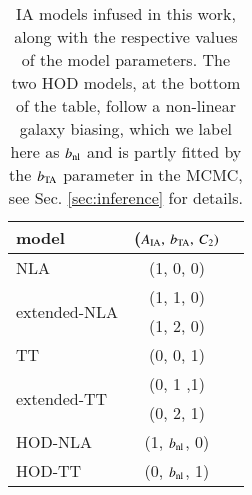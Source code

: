 \begin{table}
   \centering
    \caption{IA models infused in this work, along with the respective values of the model parameters. The two HOD models, at the bottom of the table, follow a non-linear galaxy biasing, which we label here as $b_{\rm nl}$ and is partly fitted by the $b_{\rm TA}$ parameter in the MCMC, see Sec. \ref{sec:inference} for details. }
   \begin{tabular}{@{} lcr @{}} %
      \hline
      \hline
      model   		& ($A_{\rm IA}, \: b_{\rm TA}, \: C_2)$ \\
      \hline
      NLA     		& {(1, 0, 0) }&  \\
      \multirow{2}{*}{extended-NLA }  	&   {(1, 1, 0)}   \\
      							&  {(1, 2, 0)}   \\
      TT 			&  {(0, 0, 1)} &  \\
      \multirow{2}{*}{extended-TT} 	&  {(0, 1 ,1)}   \\
      				&  {(0, 2, 1)}   \\
				HOD-NLA & {(1, $b_{\rm nl}$, 0)} \\
				HOD-TT & {(0, $b_{\rm nl}$, 1)} \\
      \hline
      \hline

   \end{tabular}
   \label{table:IAmodels}
\end{table}